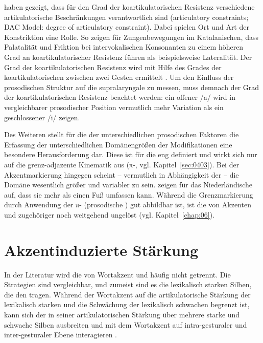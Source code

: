 \citet{Recasens2009} haben gezeigt, dass für den Grad der koartikulatorischen Resistenz verschiedene artikulatorische Beschränkungen verantwortlich sind (articulatory constraints; DAC Model: degree of articulatory constraint). Dabei spielen Ort und Art der Konstriktion eine Rolle. So zeigen \citet{Recasens2009} für Zungenbewegungen im Katalanischen, dass Palatalität und Friktion bei intervokalischen Konsonanten zu einem höheren Grad an koartikulatorischer Resistenz führen als beispielsweise Lateralität. Der Grad der koartikulatorischen Resistenz wird mit Hilfe des Grades der koartikulatorischen  zwischen zwei Gesten  ermittelt \citep[coarticulatory overlap, vgl.][]{Iskarous2010}. Um den Einfluss der prosodischen Struktur auf die supralaryngale  zu messen, muss demnach der Grad der koartikulatorischen Resistenz beachtet werden: ein offener  /a/ wird in vergleichbarer prosodischer Position vermutlich mehr Variation als ein geschlossener  /i/ zeigen.

Des Weiteren stellt für die  der unterschiedlichen prosodischen Faktoren die Erfassung der unterschiedlichen Domänengrößen der Modifikationen eine besondere Herausforderung dar. Diese ist für die  eng definiert und wirkt sich nur auf die grenz-adjazente Kinematik aus (π-, vgl. Kapitel~\ref{sec:0403}). Bei der Akzentmarkierung hingegen scheint -- vermutlich in Abhängigkeit der  -- die Domäne wesentlich größer und variabler zu sein. \citet{Cho2005b} zeigen für das Niederländische auf, dass sie mehr als einen Fuß umfassen kann. Während die Grenzmarkierung durch Anwendung der π- (prosodische ) gut abbildbar ist, ist die  von Akzenten und zugehöriger  noch weitgehend ungelöst (vgl. Kapitel~\ref{chap:06}).

\section{Akzentinduzierte Stärkung}
\label{sec:0501}

In der Literatur wird die  von Wortakzent und  häufig nicht getrennt. Die Strategien sind vergleichbar, und zumeist sind es die lexikalisch starken Silben, die den  tragen. Während der Wortakzent auf die artikulatorische Stärkung der lexikalisch starken  und die Schwächung der lexikalisch schwachen  begrenzt ist, kann sich der  in seiner artikulatorischen Stärkung über mehrere starke und schwache Silben ausbreiten und mit dem Wortakzent auf intra-gesturaler und inter-gesturaler Ebene interagieren
\citep[vgl.][]{Turk1997, Turk1999, DeJong2004, Cho2005a, Cho2005b, Cho2006, Cho2009}.

